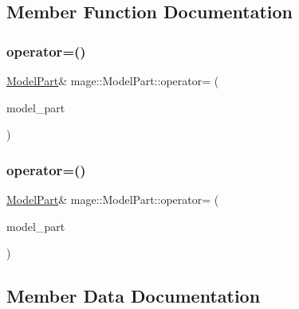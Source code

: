 \subsection{Member Function Documentation}
\hypertarget{structmage_1_1_model_part_a37e9d66b701ed84111160bf5a003b658}{}\label{structmage_1_1_model_part_a37e9d66b701ed84111160bf5a003b658} 
\subsubsection{\texorpdfstring{operator=()}{operator=()}\hspace{0.1cm}{\footnotesize\ttfamily [1/2]}}
{\footnotesize\ttfamily \hyperlink{structmage_1_1_model_part}{Model\+Part}\& mage\+::\+Model\+Part\+::operator= (\begin{DoxyParamCaption}\item[{const \hyperlink{structmage_1_1_model_part}{Model\+Part} \&}]{model\+\_\+part }\end{DoxyParamCaption})\hspace{0.3cm}{\ttfamily [default]}}

\hypertarget{structmage_1_1_model_part_a8337b8034d9a43514690a2db3d0f43c7}{}\label{structmage_1_1_model_part_a8337b8034d9a43514690a2db3d0f43c7} 
\subsubsection{\texorpdfstring{operator=()}{operator=()}\hspace{0.1cm}{\footnotesize\ttfamily [2/2]}}
{\footnotesize\ttfamily \hyperlink{structmage_1_1_model_part}{Model\+Part}\& mage\+::\+Model\+Part\+::operator= (\begin{DoxyParamCaption}\item[{\hyperlink{structmage_1_1_model_part}{Model\+Part} \&\&}]{model\+\_\+part }\end{DoxyParamCaption})\hspace{0.3cm}{\ttfamily [default]}}



\subsection{Member Data Documentation}
\hypertarget{structmage_1_1_model_part_a3ab6e2faae44453d60cf0ff4876f49eb}{}\label{structmage_1_1_model_part_a3ab6e2faae44453d60cf0ff4876f49eb} 

